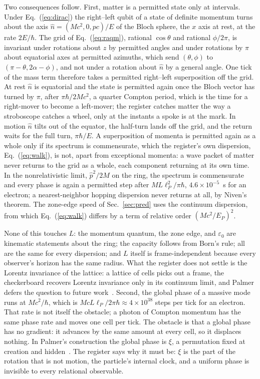 \documentclass[aps,prd,twocolumn,superscriptaddress,nofootinbib]{revtex4-2}
\begin{document}
Two consequences follow. First, matter is a permitted state only at intervals. Under Eq.~(\ref{eq:dirac}) the right--left qubit of a state of definite momentum turns about the axis $\hat n = (Mc^2, 0, pc)/E$ of the Bloch sphere, the $x$ axis at rest, at the rate $2E/\hbar$. The grid of Eq.~(\ref{eq:raqm}), rational $\cos\theta$ and rational $\phi/2\pi$, is invariant under rotations about $z$ by permitted angles and under rotations by $\pi$ about equatorial axes at permitted azimuths, which send $(\theta,\phi)$ to $(\pi-\theta, 2\alpha-\phi)$, and not under a rotation about $\hat n$ by a general angle. One tick of the mass term therefore takes a permitted right--left superposition off the grid. At rest $\hat n$ is equatorial and the state is permitted again once the Bloch vector has turned by $\pi$, after $\pi\hbar/2Mc^2$, a quarter Compton period, which is the time for a right-mover to become a left-mover; the register catches matter the way a stroboscope catches a wheel, only at the instants a spoke is at the mark. In motion $\hat n$ tilts out of the equator, the half-turn lands off the grid, and the return waits for the full turn, $\pi\hbar/E$. A superposition of momenta is permitted again as a whole only if its spectrum is commensurate, which the register's own dispersion, Eq.~(\ref{eq:walk}), is not, apart from exceptional momenta: a wave packet of matter never returns to the grid as a whole, each component returning at its own time. In the nonrelativistic limit, $\hat p^2/2M$ on the ring, the spectrum is commensurate and every phase is again a permitted step after $ML\ell_P^2/\pi\hbar$, $4.6\times10^{-5}$~s for an electron; a nearest-neighbor hopping dispersion never returns at all, by Niven's theorem. The zone-edge speed of Sec.~\ref{sec:pred} uses the continuum dispersion, from which Eq.~(\ref{eq:walk}) differs by a term of relative order $(Mc^2/E_P)^2$.

None of this touches $L$: the momentum quantum, the zone edge, and $\varepsilon_0$ are kinematic statements about the ring; the capacity follows from Born's rule; all are the same for every dispersion; and $L$ itself is frame-independent because every observer's horizon has the same radius. What the register does not settle is the Lorentz invariance of the lattice: a lattice of cells picks out a frame, the checkerboard recovers Lorentz invariance only in its continuum limit, and Palmer defers the question to future work~\cite{palmer2026c}. Second, the global phase of a massive mode runs at $Mc^2/\hbar$, which is $McL\ell_P/2\pi\hbar\approx4\times10^{38}$ steps per tick for an electron. That rate is not itself the obstacle; a photon of Compton momentum has the same phase rate and moves one cell per tick. The obstacle is that a global phase has no gradient: it advances by the same amount at every cell, so it displaces nothing. In Palmer's construction the global phase is $\xi$, a permutation fixed at creation and hidden~\cite{palmer2026c}. The register says why it must be: $\xi$ is the part of the rotation that is not motion, the particle's internal clock, and a uniform phase is invisible to every relational observable.
\end{document}
